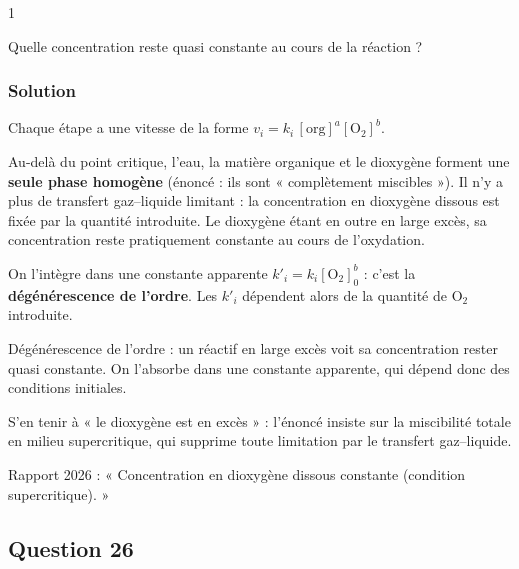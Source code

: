 \documentclass[11pt,a4paper]{article}
\begin{document}
\begin{indication}{1}

Quelle concentration reste quasi constante au cours de la réaction ?

\end{indication}

\hypertarget{solution-24}{%
\subsubsection{Solution}\label{solution-24}}

Chaque étape a une vitesse de la forme \(v_i=k_i\,[\mathrm{org}]^a[\mathrm{O_2}]^b\).

Au-delà du point critique, l'eau, la matière organique et le dioxygène forment une \textbf{seule phase homogène} (énoncé : ils sont « complètement miscibles »). Il n'y a plus de transfert gaz--liquide limitant : la concentration en dioxygène dissous est fixée par la quantité introduite. Le dioxygène étant en outre en large excès, sa concentration reste pratiquement constante au cours de l'oxydation.

On l'intègre dans une constante apparente \(k'_i=k_i[\mathrm{O_2}]_0^b\) : c'est la \textbf{dégénérescence de l'ordre}. Les \(k'_i\) dépendent alors de la quantité de O\(_2\) introduite.

\begin{methode}

Dégénérescence de l'ordre : un réactif en large excès voit sa concentration rester quasi constante. On l'absorbe dans une constante apparente, qui dépend donc des conditions initiales.

\end{methode}

\begin{piege}

S'en tenir à « le dioxygène est en excès » : l'énoncé insiste sur la miscibilité totale en milieu supercritique, qui supprime toute limitation par le transfert gaz--liquide.

\end{piege}

\begin{jury}

Rapport 2026 : « Concentration en dioxygène dissous constante (condition supercritique). »

\end{jury}

\hypertarget{question-26}{%
\subsection{Question 26}\label{question-26}}
\end{document}
